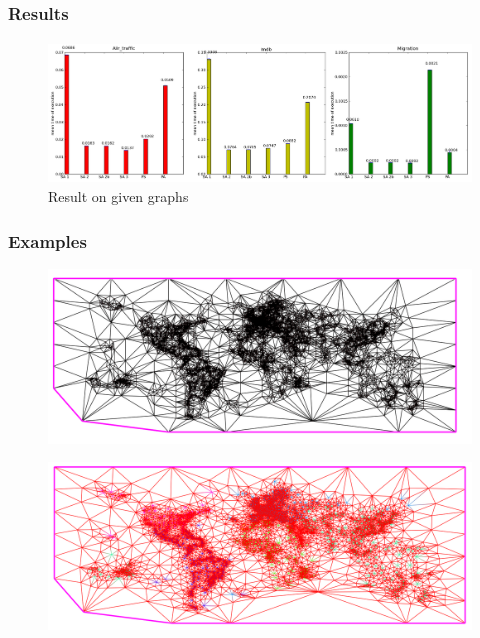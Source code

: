 \begin{frame}
\frametitle{Results}
\framesubtitle{}
\begin{exampleblock}{}
\begin{figure}[!h]
\centering
\includegraphics[width=\textwidth]{../rapport/img/histogramme.png}
\caption{Result on given graphs}
\end{figure}
\end{exampleblock}{}
\end{frame}

\begin{frame}
\frametitle{Examples}
\begin{exampleblock}{}
\begin{figure}[!h]
\centering
\includegraphics[scale=0.2]{../rapport/img/aiir_traffic_origin.png}
\end{figure}
\end{exampleblock}{}
\pause
\begin{exampleblock}{}
\begin{figure}[!h]
\centering
\includegraphics[scale=0.2]{../rapport/img/aiir_traffic_tutted.png}
\end{figure}
\end{exampleblock}{}
\end{frame}

